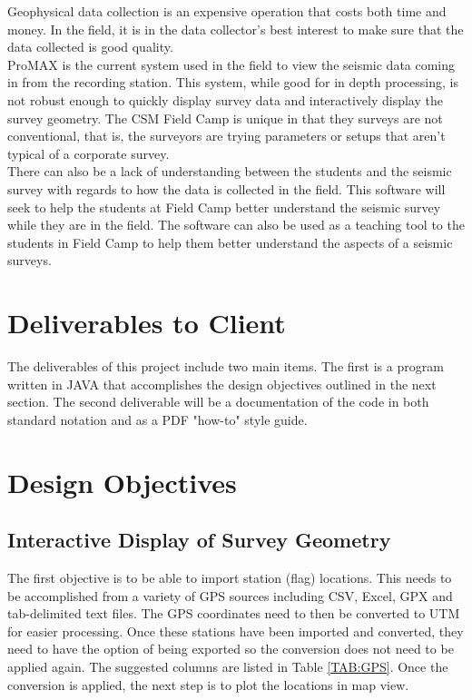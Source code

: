 \documentclass[11pt]{article}
\begin{document}
Geophysical data collection is an expensive operation that costs both time and money. In the field, it is in the data collector's best interest to make sure that the data collected is good quality. \\

ProMAX is the current system used in the field to view the seismic data coming in from the recording station. This system, while good for in depth processing, is not robust enough to quickly display survey data and interactively display the survey geometry. The CSM Field Camp is unique in that they surveys are not conventional, that is, the surveyors are trying parameters or setups that aren't typical of a corporate survey. \\

There can also be a lack of understanding between the students and the seismic survey with regards to how the data is collected in the field. This software will seek to help the students at Field Camp better understand the seismic survey while they are in the field. The software can also be used as a teaching tool to the students in Field Camp to help them better understand the aspects of a seismic surveys.

\section{Deliverables to Client}

The deliverables of this project include two main items. The first is a program written in JAVA that accomplishes the design objectives outlined in the next section. The second deliverable will be a documentation of the code in both standard notation and as a PDF "how-to" style guide.

\section{Design Objectives}
\subsection{Interactive Display of Survey Geometry}

The first objective is to be able to import station (flag) locations. This needs to be accomplished from a variety of GPS sources including CSV, Excel, GPX and tab-delimited text files. The GPS coordinates need to then be converted to UTM for easier processing. Once these stations have been imported and converted, they need to have the option of being exported so the conversion does not need to be applied again. The suggested columns are listed in Table \ref{TAB:GPS}. Once the conversion is applied, the next step is to plot the locations in map view.
\end{document}
